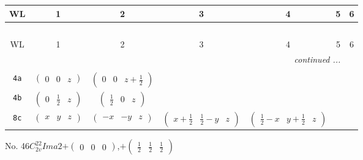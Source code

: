 \documentclass[fleqn,9pt,landscape]{jsarticle}
\begin{document}
\begin{center}
\renewcommand{\arraystretch}{1.2}
\begin{longtable}{ccccccc}
 \hline \hline
WL & 1 & 2 & 3 & 4 & 5 & 6 \\ \hline \endfirsthead

\multicolumn{6}{l}{\tablename\ \thetable{}} \\
 \hline \hline
WL & 1 & 2 & 3 & 4 & 5 & 6 \\ \hline \endhead

 \hline \hline
\multicolumn{6}{r}{\footnotesize\it continued ...} \\ \endfoot

 \hline \hline
\multicolumn{6}{r}{} \\ \endlastfoot

{\tt 4a} & $ \begin{pmatrix} 0 & 0 & z \end{pmatrix} $ & $ \begin{pmatrix} 0 & 0 & z + \frac{1}{2} \end{pmatrix} $ & $  $ & $  $ \\ \hline
{\tt 4b} & $ \begin{pmatrix} 0 & \frac{1}{2} & z \end{pmatrix} $ & $ \begin{pmatrix} \frac{1}{2} & 0 & z \end{pmatrix} $ & $  $ & $  $ \\ \hline
{\tt 8c} & $ \begin{pmatrix} x & y & z \end{pmatrix} $ & $ \begin{pmatrix} - x & - y & z \end{pmatrix} $ & $ \begin{pmatrix} x + \frac{1}{2} & \frac{1}{2} - y & z \end{pmatrix} $ & $ \begin{pmatrix} \frac{1}{2} - x & y + \frac{1}{2} & z \end{pmatrix} $ \\
\end{longtable}
\end{center}
\newpage
No. 46\quad$C_{2v}^{22}$\quad$Ima2$\quad[ orthorhombic ]\quad$+\begin{pmatrix} 0 & 0 & 0 \end{pmatrix}$,\quad $+\begin{pmatrix} \frac{1}{2} & \frac{1}{2} & \frac{1}{2} \end{pmatrix}$
\end{document}
